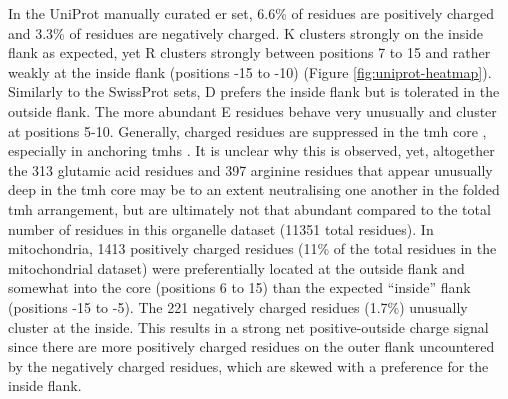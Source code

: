 In the UniProt manually curated \gls{er} set, 6.6\% of residues are positively charged and 3.3\% of residues are negatively charged.
K clusters strongly on the inside flank as expected, yet R clusters strongly between positions 7 to 15 and rather weakly at the inside flank (positions -15 to -10) (Figure \ref{fig:uniprot-heatmap}).
Similarly to the SwissProt sets, D prefers the inside flank but is tolerated in the outside flank.
The more abundant E residues behave very unusually and cluster at positions 5-10.
Generally, charged residues are suppressed in the \gls{tmh} core \cite{Sharpe2010, Baeza-Delgado2013}, especially in anchoring \gls{tmh}s \cite{Baker2017}.
It is unclear why this is observed, yet, altogether the 313 glutamic acid residues and 397 arginine residues that appear unusually deep in the \gls{tmh} core may be to an extent neutralising one another in the folded \gls{tmh} arrangement, but are ultimately not that abundant compared to the total number of residues in this organelle dataset (11351 total residues).
In mitochondria, 1413 positively charged residues (11\% of the total residues in the mitochondrial dataset) were preferentially located at the outside flank and somewhat into the core (positions 6 to 15) than the expected ``inside'' flank (positions -15 to -5).
The 221 negatively charged residues (1.7\%) unusually cluster at the inside.
This results in a strong net positive\--outside charge signal since there are more positively charged residues on the outer flank uncountered by the negatively charged residues, which are skewed with a preference for the inside flank.

